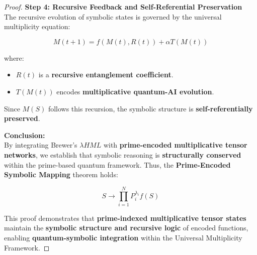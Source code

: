 \documentclass{article}
\theoremstyle{plain}
\begin{document}
\begin{proof}
\textbf{Step 4: Recursive Feedback and Self-Referential Preservation}\\
The recursive evolution of symbolic states is governed by the universal multiplicity equation:

\[
M(t+1) = f(M(t), R(t)) + \alpha T(M(t))
\]

where:
\begin{itemize}
    \item \( R(t) \) is a \textbf{recursive entanglement coefficient}.
    \item \( T(M(t)) \) encodes \textbf{multiplicative quantum-AI evolution}.
\end{itemize}

Since \( M(S) \) follows this recursion, the symbolic structure is \textbf{self-referentially preserved}.

\textbf{Conclusion:}\\
By integrating Brewer’s \(\lambda HML\) with \textbf{prime-encoded multiplicative tensor networks}, we establish that symbolic reasoning is \textbf{structurally conserved} within the prime-based quantum framework. Thus, the \textbf{Prime-Encoded Symbolic Mapping} theorem holds:

\[
S \to \prod_{i=1}^{N} P_i^{\lambda_i} f(S)
\]

This proof demonstrates that \textbf{prime-indexed multiplicative tensor states} maintain the \textbf{symbolic structure and recursive logic} of encoded functions, enabling \textbf{quantum-symbolic integration} within the Universal Multiplicity Framework.
\end{proof}

\nocite{*}


\end{document}
